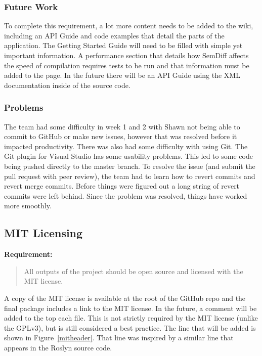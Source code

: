 \documentclass[draftclsnofoot,onecolumn]{IEEEtran}
\begin{document}
\subsubsection{Future Work}

To complete this requirement, a lot more content needs to be added to the 
wiki, including an API Guide and code examples that detail the parts of the 
application. The Getting Started Guide will need to be filled with simple yet 
important information. A performance section that details how SemDiff affects 
the speed of compilation requires tests to be run and that information must 
be added to the page. In the future there will be an API Guide using the XML 
documentation inside of the source code.

\subsubsection{Problems}

The team had some difficulty in week 1 and 2 with Shawn not being able to 
commit to GitHub or make new issues, however that was resolved before it 
impacted productivity. There was also had some difficulty with using Git. The 
Git plugin for Visual Studio has some usability problems. This led to some 
code being pushed directly to the master branch. To resolve the issue (and 
submit the pull request with peer review), the team had to learn how to 
revert commits and revert merge commits. Before things were figured out a 
long string of revert commits were left behind. Since the problem was 
resolved, things have worked more smoothly.

\subsection{MIT Licensing}%

\textbf{Requirement:}

\begin{quote}

All outputs of the project should be open source and licensed with the MIT 
license.

\end{quote}

A copy of the MIT license is available at the root of the GitHub repo and the 
final package includes a link to the MIT license. In the future, a comment 
will be added to the top each file. This is not strictly required by the MIT 
license (unlike the GPLv3), but is still considered a best practice. The line 
that will be added is shown in Figure~\ref{mitheader}. That line was inspired 
by a similar line that appears in the Roslyn source code.
\end{document}
